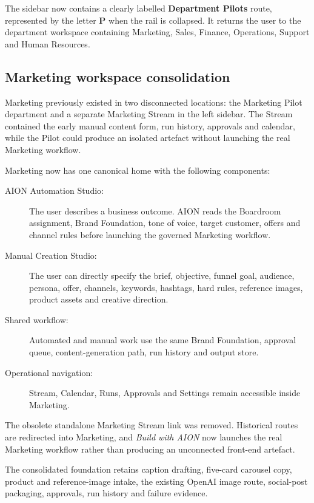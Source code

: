 The sidebar now contains a clearly labelled \textbf{Department Pilots} route,
represented by the letter \textbf{P} when the rail is collapsed. It returns the
user to the department workspace containing Marketing, Sales, Finance,
Operations, Support and Human Resources.

\subsection{Marketing workspace consolidation}

Marketing previously existed in two disconnected locations: the Marketing Pilot
department and a separate Marketing Stream in the left sidebar. The Stream
contained the early manual content form, run history, approvals and calendar,
while the Pilot could produce an isolated artefact without launching the real
Marketing workflow.

Marketing now has one canonical home with the following components:

\begin{description}
    \item[AION Automation Studio:] The user describes a business outcome. AION
    reads the Boardroom assignment, Brand Foundation, tone of voice, target
    customer, offers and channel rules before launching the governed Marketing
    workflow.
    \item[Manual Creation Studio:] The user can directly specify the brief,
    objective, funnel goal, audience, persona, offer, channels, keywords,
    hashtags, hard rules, reference images, product assets and creative direction.
    \item[Shared workflow:] Automated and manual work use the same Brand
    Foundation, approval queue, content-generation path, run history and output
    store.
    \item[Operational navigation:] Stream, Calendar, Runs, Approvals and Settings
    remain accessible inside Marketing.
\end{description}

The obsolete standalone Marketing Stream link was removed. Historical routes are
redirected into Marketing, and \emph{Build with AION} now launches the real
Marketing workflow rather than producing an unconnected front-end artefact.

The consolidated foundation retains caption drafting, five-card carousel copy,
product and reference-image intake, the existing OpenAI image route, social-post
packaging, approvals, run history and failure evidence.

